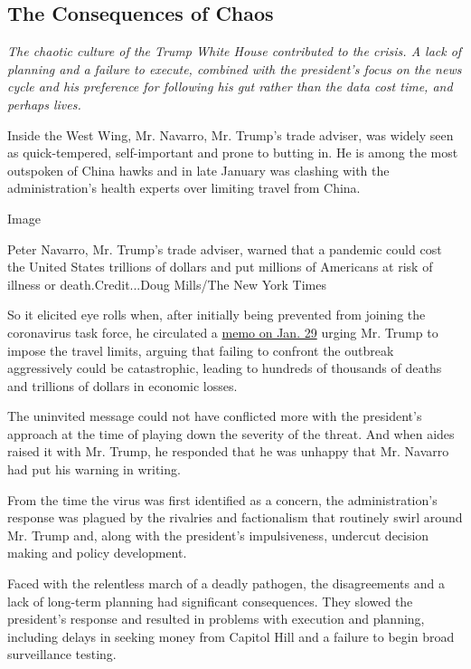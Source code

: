 \hypertarget{the-consequences-of-chaos}{%
\subsection{The Consequences of Chaos}\label{the-consequences-of-chaos}}

\emph{The chaotic culture of the Trump White House contributed to the
crisis. A lack of planning and a failure to execute, combined with the
president's focus on the news cycle and his preference for following his
gut rather than the data cost time, and perhaps lives.}

Inside the West Wing, Mr. Navarro, Mr. Trump's trade adviser, was widely
seen as quick-tempered, self-important and prone to butting in. He is
among the most outspoken of China hawks and in late January was clashing
with the administration's health experts over limiting travel from
China.

Image

Peter Navarro, Mr. Trump's trade adviser, warned that a pandemic could
cost the United States trillions of dollars and put millions of
Americans at risk of illness or death.Credit...Doug Mills/The New York
Times

So it elicited eye rolls when, after initially being prevented from
joining the coronavirus task force, he circulated a
\href{https://www.nytimes3xbfgragh.onion/2020/04/06/us/politics/navarro-warning-trump-coronavirus.html}{memo
on Jan. 29} urging Mr. Trump to impose the travel limits, arguing that
failing to confront the outbreak aggressively could be catastrophic,
leading to hundreds of thousands of deaths and trillions of dollars in
economic losses.

The uninvited message could not have conflicted more with the
president's approach at the time of playing down the severity of the
threat. And when aides raised it with Mr. Trump, he responded that he
was unhappy that Mr. Navarro had put his warning in writing.

From the time the virus was first identified as a concern, the
administration's response was plagued by the rivalries and factionalism
that routinely swirl around Mr. Trump and, along with the president's
impulsiveness, undercut decision making and policy development.

Faced with the relentless march of a deadly pathogen, the disagreements
and a lack of long-term planning had significant consequences. They
slowed the president's response and resulted in problems with execution
and planning, including delays in seeking money from Capitol Hill and a
failure to begin broad surveillance testing.

